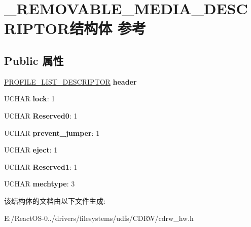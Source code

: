 \hypertarget{struct___r_e_m_o_v_a_b_l_e___m_e_d_i_a___d_e_s_c_r_i_p_t_o_r}{}\section{\+\_\+\+R\+E\+M\+O\+V\+A\+B\+L\+E\+\_\+\+M\+E\+D\+I\+A\+\_\+\+D\+E\+S\+C\+R\+I\+P\+T\+O\+R结构体 参考}
\label{struct___r_e_m_o_v_a_b_l_e___m_e_d_i_a___d_e_s_c_r_i_p_t_o_r}
\subsection*{Public 属性}
\begin{DoxyCompactItemize}
\item 
\mbox{\label{struct___r_e_m_o_v_a_b_l_e___m_e_d_i_a___d_e_s_c_r_i_p_t_o_r_a228ade11c8c3b9aa6688363be48a0a6b}} 
\hyperlink{struct___p_r_o_f_i_l_e___l_i_s_t___d_e_s_c_r_i_p_t_o_r}{P\+R\+O\+F\+I\+L\+E\+\_\+\+L\+I\+S\+T\+\_\+\+D\+E\+S\+C\+R\+I\+P\+T\+OR} {\bfseries header}
\item 
\mbox{\label{struct___r_e_m_o_v_a_b_l_e___m_e_d_i_a___d_e_s_c_r_i_p_t_o_r_aa7ac6cecd87436830f4c37dab492d3af}} 
U\+C\+H\+AR {\bfseries lock}\+: 1
\item 
\mbox{\label{struct___r_e_m_o_v_a_b_l_e___m_e_d_i_a___d_e_s_c_r_i_p_t_o_r_aab8d4a2e37a9fa4274e85415cbd10db0}} 
U\+C\+H\+AR {\bfseries Reserved0}\+: 1
\item 
\mbox{\label{struct___r_e_m_o_v_a_b_l_e___m_e_d_i_a___d_e_s_c_r_i_p_t_o_r_a3270dbbcf49ec74304f81b2ba210b56a}} 
U\+C\+H\+AR {\bfseries prevent\+\_\+jumper}\+: 1
\item 
\mbox{\label{struct___r_e_m_o_v_a_b_l_e___m_e_d_i_a___d_e_s_c_r_i_p_t_o_r_a313042abf385c99bcc59244ca3c9c330}} 
U\+C\+H\+AR {\bfseries eject}\+: 1
\item 
\mbox{\label{struct___r_e_m_o_v_a_b_l_e___m_e_d_i_a___d_e_s_c_r_i_p_t_o_r_ae833d3219a1f5092823f6d8ef4728c5b}} 
U\+C\+H\+AR {\bfseries Reserved1}\+: 1
\item 
\mbox{\label{struct___r_e_m_o_v_a_b_l_e___m_e_d_i_a___d_e_s_c_r_i_p_t_o_r_a7855dcb58094aa86059b096225029926}} 
U\+C\+H\+AR {\bfseries mechtype}\+: 3
\end{DoxyCompactItemize}


该结构体的文档由以下文件生成\+:\begin{DoxyCompactItemize}
\item 
E\+:/\+React\+O\+S-\/0../drivers/filesystems/udfs/\+C\+D\+R\+W/cdrw\+\_\+hw.\+h\end{DoxyCompactItemize}
